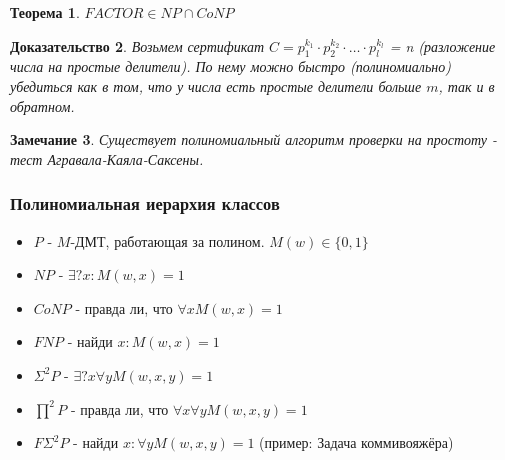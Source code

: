 \documentclass{beamer}
\theoremstyle{plain}
\newtheorem{thm}{Теорема}
\newtheorem{rmk}[thm]{Замечание}
\newtheorem{proof-rus}[thm]{Доказательство}
\theoremstyle{definition}
\begin{document}
\begin{frame}
    \begin{thm}
    $FACTOR \in NP \cap CoNP$
    \end{thm}
    \begin{proof-rus}
        Возьмем сертификат $C=p_1^{k_1} \cdot p_2^{k_2} \cdot \dotso \cdot p_l^{k_l}$ = n (разложение числа на простые делители). По нему можно быстро (полиномиально) убедиться как в том, что у числа есть простые делители больше $m$, так и в обратном.
    \end{proof-rus}
    \begin{rmk}
        Существует полиномиальный алгоритм проверки на простоту - тест Агравала-Каяла-Саксены.
    \end{rmk}
\end{frame}

\begin{frame}
    \frametitle{Полиномиальная иерархия классов}
    \begin{itemize}
        \item $P$ - $M$-ДМТ, работающая за полином. $M(w)\in\{0, 1\}$
        \item $NP$ - $\exists ? x : M(w,x)=1$
        \item $CoNP$ - правда ли, что $\forall x M(w,x)=1$
        \item $FNP$ - найди $x : M(w, x)=1$
        \item $\Sigma^2P$ - $\exists ? x \forall y M(w,x,y)=1$
        \item $\prod^2P$ - правда ли, что $\forall x \forall y M(w,x,y)=1$
        \item $F\Sigma^2P$ - найди $x : \forall y M(w,x,y)=1$ (пример: Задача коммивояжёра)
    \end{itemize}
\end{frame}
\end{document}
